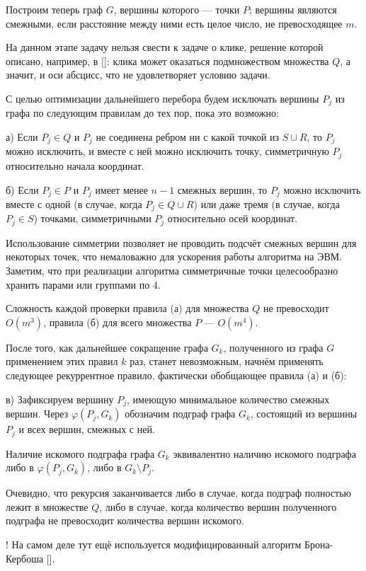\documentclass{article}
\begin{document}
Построим теперь граф $G$, вершины которого --- точки $P$;
вершины являются смежными, если расстояние между ними есть целое число, не превосходящее $m$.

На данном этапе задачу нельзя свести к задаче о клике, решение которой описано, например, в [\cite{BronKerbosh}]:
клика может оказаться подмножеством множества $Q$, а значит, и оси абсцисс, что не удовлетворяет условию задачи.

С целью оптимизации дальнейшего перебора будем исключать вершины $P_j$ из графа по следующим правилам до тех пор, пока это возможно:

а) Если $P_j \in Q$ и $P_j$ не соединена ребром ни с какой точкой из $S \cup R$, то $P_j$ можно исключить, и вместе с ней можно исключить точку, симметричную $P_j$ относительно начала координат.

б) Если $P_j \in P$ и $P_j$ имеет менее $n-1$ смежных вершин, то $P_j$ можно исключить вместе с одной (в случае, когда $P_j \in Q \cup R$) или даже тремя (в случае, когда $P_j \in S$) точками, симметричными $P_j$ относительно осей координат.

Использование симметрии позволяет не проводить подсчёт смежных вершин для некоторых точек, что немаловажно для ускорения работы алгоритма на ЭВМ.
Заметим, что при реализации алгоритма симметричные точки целесообразно хранить парами или группами по 4.

Сложность каждой проверки правила (а) для множества $Q$ не превосходит $O(m^3)$, правила (б) для всего множества $P$ --- $O(m^4)$.


После того, как дальнейшее сокращение графа $G_k$, полученного из графа $G$ применением этих правил $k$ раз, станет невозможным, начнём применять следующее рекуррентное правило, фактически обобщающее правила (а) и (б):

в)
Зафиксируем вершину $P_j$, имеющую минимальное количество смежных вершин.
Через $\varphi(P_j,G_k)$ обозначим подграф графа $G_k$, состоящий из вершины $P_j$ и всех вершин, смежных с ней.

Наличие искомого подграфа графа $G_k$ эквивалентно наличию искомого подграфа либо в $\varphi(P_j,G_k)$, либо в $G_k \setminus P_j$.

Очевидно, что рекурсия заканчивается либо в случае, когда подграф полностью лежит в множестве $Q$, либо в случае, когда количество вершин полученного подграфа не превосходит количества вершин искомого.


! На самом деле тут ещё используется модифицированный алгоритм Брона-Кербоша [\cite{BronKerbosh}].
\end{document}
